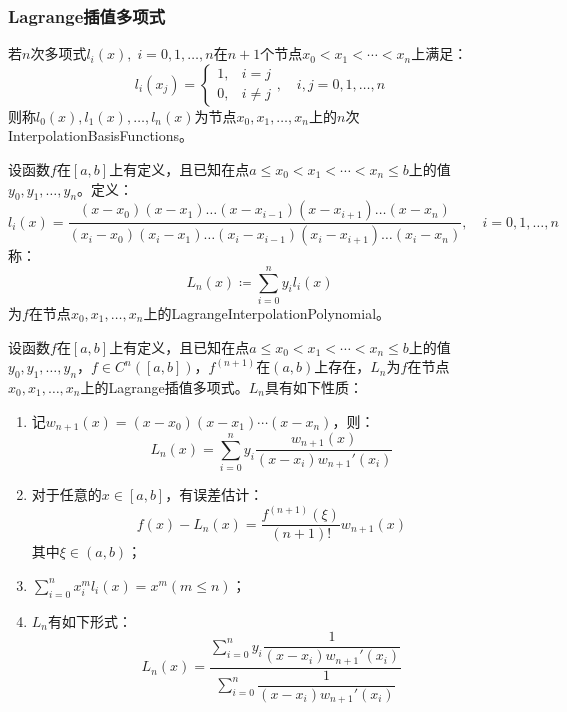 \subsubsection{Lagrange插值多项式}
\begin{definition}
	若$n$次多项式$l_i(x),\;i=0,1,\dots,n$在$n+1$个节点$x_0<x_1<\cdots<x_n$上满足：
	\begin{equation*}
		l_i(x_j)=
		\begin{cases}
			1,& i=j \\
			0,& i\ne j
		\end{cases},\quad
		i,j=0,1,\dots,n
	\end{equation*}
	则称$l_0(x),l_1(x),\dots,l_n(x)$为节点$x_0,x_1,\dots,x_n$上的$n$次\gls{InterpolationBasisFunctions}。
\end{definition}
\begin{definition}
	设函数$f$在$[a,b]$上有定义，且已知在点$a\leqslant x_0<x_1<\cdots<x_n\leqslant b$上的值$y_0,y_1,\dots,y_n$。定义：
	\begin{equation*}
		l_i(x)=\frac{(x-x_0)(x-x_1)\dots(x-x_{i-1})(x-x_{i+1})\dots(x-x_n)}{(x_i-x_0)(x_i-x_1)\dots(x_i-x_{i-1})(x_i-x_{i+1})\dots(x_i-x_n)},\quad i=0,1,\dots,n
	\end{equation*}
	称：
	\begin{equation*}
		L_n(x)\coloneq\sum_{i=0}^{n}y_il_i(x)
	\end{equation*}
	为$f$在节点$x_0,x_1,\dots,x_n$上的\gls{LagrangeInterpolationPolynomial}。
\end{definition}
\begin{property}\label{prop:LagrangeInterpolationPolynomial}
	设函数$f$在$[a,b]$上有定义，且已知在点$a\leqslant x_0<x_1<\cdots<x_n\leqslant b$上的值$y_0,y_1,\dots,y_n$，$f\in C^n([a,b])$，$f^{(n+1)}$在$(a,b)$上存在，$L_n$为$f$在节点$x_0,x_1,\dots,x_n$上的Lagrange插值多项式。$L_n$具有如下性质：
	\begin{enumerate}
		\item 记$w_{n+1}(x)=(x-x_0)(x-x_1)\cdots(x-x_n)$，则：
		\begin{equation*}
			L_n(x)=\sum_{i=0}^{n}y_i\frac{w_{n+1}(x)}{(x-x_i)w_{n+1}'(x_i)}
		\end{equation*}
		\item 对于任意的$x\in[a,b]$，有误差估计：
		\begin{equation*}
			f(x)-L_n(x)=\frac{f^{(n+1)}(\xi)}{(n+1)!}w_{n+1}(x)
		\end{equation*}
		其中$\xi\in(a,b)$；
		\item $\sum\limits_{i=0}^{n}x_i^ml_i(x)=x^m(m\leqslant n)$；
		\item $L_n$有如下形式：
		\begin{equation*}
			L_n(x)=\frac{\sum\limits_{i=0}^{n}y_i\dfrac{1}{(x-x_i)w_{n+1}'(x_i)}}{\sum\limits_{i=0}^{n}\dfrac{1}{(x-x_i)w_{n+1}'(x_i)}}
		\end{equation*}
	\end{enumerate}
\end{property}
